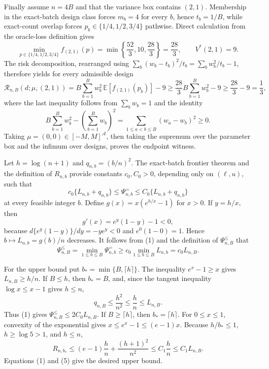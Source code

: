 Finally assume \(n=4B\) and that the variance box contains \((2,1)\). Membership in the exact-batch design class forces \(m_b=4\) for every \(b\), hence \(t_b=1/B\), while exact-count overlap forces \(p_b\in\{1/4,1/2,3/4\}\) pathwise. Direct calculation from the oracle-loss definition gives
\[
\min_{p\in\{1/4,1/2,3/4\}} f_{(2,1)}(p)
=\min\left\{\frac{52}{3},10,\frac{28}{3}\right\}
=\frac{28}{3},
\qquad V^*(2,1)=9.                                \tag{13}
\]
The risk decomposition, rearranged using
\(\sum_b(w_b-t_b)^2/t_b=\sum_bw_b^2/t_b-1\), therefore yields for every admissible design
\[
\mathcal R_{n,B}(d;\mu,(2,1))
=B\sum_{b=1}^Bw_b^2\,
  \mathbb E[f_{(2,1)}(p_b)]-9
\geq\frac{28}{3}B\sum_{b=1}^Bw_b^2-9
\geq\frac{28}{3}-9=\frac13,                       \tag{14}
\]
where the last inequality follows from \(\sum_bw_b=1\) and the identity
\[
B\sum_{b=1}^Bw_b^2-\left(\sum_{b=1}^Bw_b\right)^2
=\sum_{1\leq a<b\leq B}(w_a-w_b)^2\geq0.
\]
Taking \(\mu=(0,0)\in[-M,M]^{\mathcal A}\), then taking the supremum over the parameter box and the infimum over designs, proves the endpoint witness.

Let \(h=\log(n+1)\) and \(q_{n,b}=(b/n)^2\). The exact-batch frontier theorem and the definition of \(R_{n,b}\) provide constants \(c_0,C_0>0\), depending only on \((\ell,u)\), such that
\[
c_0\{L_{n,b}+q_{n,b}\}\leq\Psi^{=}_{n,b}
\leq C_0\{L_{n,b}+q_{n,b}\}                       \tag{1}
\]
at every feasible integer \(b\). Define \(g(x)=x(e^{h/x}-1)\) for \(x>0\). If \(y=h/x\), then
\[
g'(x)=e^y(1-y)-1<0,                                 \tag{2}
\]
because \(d\{e^y(1-y)\}/dy=-ye^y<0\) and \(e^0(1-0)=1\). Hence \(b\mapsto L_{n,b}=g(b)/n\) decreases. It follows from (1) and the definition of \(\Psi^{\leq}_{n,B}\) that
\[
\Psi^{\leq}_{n,B}
=\min_{1\leq b\leq B}\Psi^{=}_{n,b}
\geq c_0\min_{1\leq b\leq B}L_{n,b}
=c_0L_{n,B}.                                        \tag{3}
\]

For the upper bound put \(b_*=\min\{B,\lceil h\rceil\}\). The inequality \(e^x-1\geq x\) gives \(L_{n,B}\geq h/n\). If \(B\leq h\), then \(b_*=B\), and, since the tangent inequality \(\log x\leq x-1\) gives \(h\leq n\),
\[
q_{n,B}\leq\frac{h^2}{n^2}\leq\frac{h}{n}\leq L_{n,B}. \tag{4}
\]
Thus (1) gives \(\Psi^{\leq}_{n,B}\leq2C_0L_{n,B}\). If \(B\geq\lceil h\rceil\), then \(b_*=\lceil h\rceil\). For \(0\leq x\leq1\), convexity of the exponential gives
\(x\leq e^x-1\leq(e-1)x\). Because \(h/b_*\leq1\), \(h\geq\log5>1\), and \(h\leq n\),
\[
R_{n,b_*}
\leq(e-1)\frac{h}{n}+\frac{(h+1)^2}{n^2}
\leq C_1\frac{h}{n}
\leq C_1L_{n,B}.                                    \tag{5}
\]
Equations (1) and (5) give the desired upper bound.

